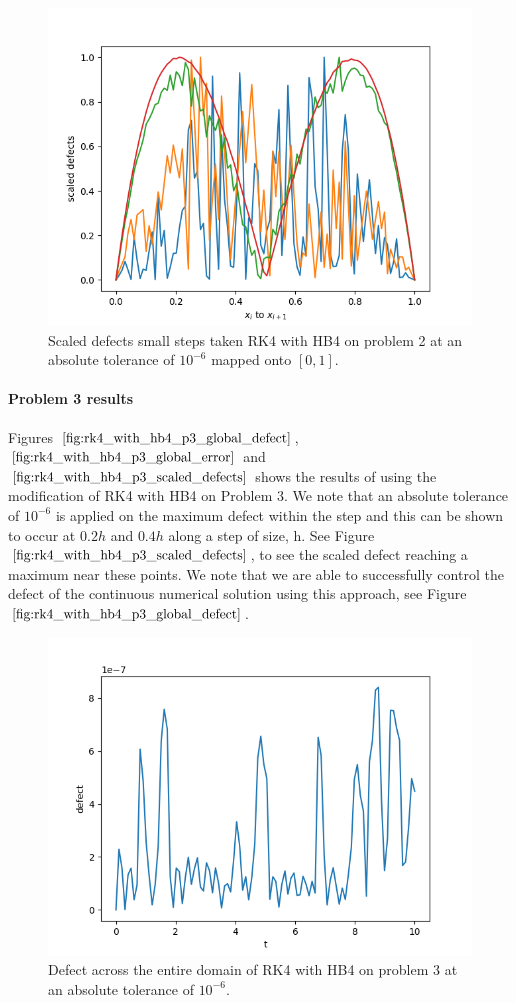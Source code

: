 \documentclass{article}
\begin{document}
\begin{figure}[H]
\centering
\includegraphics[width=0.7\linewidth]{./figures/rk4_with_hb4_p2_scaled_defects_small_steps}
\caption{Scaled defects small steps taken RK4 with HB4 on problem 2 at an absolute tolerance of $10^{-6}$ mapped onto $[0, 1]$.}
\label{fig:rk4_with_hb4_p2_scaled_defects_small_steps}
\end{figure}

\paragraph{Problem 3 results}
Figures $\ref{fig:rk4_with_hb4_p3_global_defect}$, $\ref{fig:rk4_with_hb4_p3_global_error}$ and $\ref{fig:rk4_with_hb4_p3_scaled_defects}$ shows the results of using the modification of RK4 with HB4 on Problem 3. We note that an absolute tolerance of $10^{-6}$ is applied on the maximum defect within the step and this can be shown to occur at $0.2h$ and $0.4h$ along a step of size, h. See Figure $\ref{fig:rk4_with_hb4_p3_scaled_defects}$, to see the scaled defect reaching a maximum near these points. We note that we are able to successfully control the defect of the continuous numerical solution using this approach, see Figure $\ref{fig:rk4_with_hb4_p3_global_defect}$. 

\begin{figure}[H]
\centering
\includegraphics[width=0.7\linewidth]{./figures/rk4_with_hb4_p3_global_defect}
\caption{Defect across the entire domain of RK4 with HB4 on problem 3 at an absolute tolerance of $10^{-6}$.}
\label{fig:rk4_with_hb4_p3_global_defect}
\end{figure}
\end{document}
